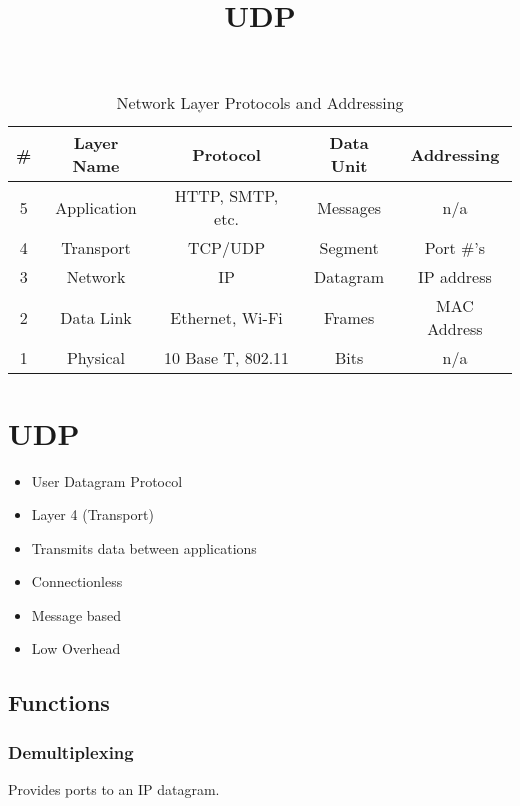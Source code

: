 \documentclass{article}
\title{UDP}
\begin{document}
\maketitle

\begin{table}[h!]
    \centering
    \begin{tabular}{|c|c|c|c|c|}
        \hline
        \# & \textbf{Layer Name} & \textbf{Protocol} & \textbf{Data Unit} & \textbf{Addressing} \\
        \hline
        5  & Application         & HTTP, SMTP, etc.  & Messages           & n/a                 \\
        4  & Transport           & TCP/UDP           & Segment            & Port \#'s           \\
        3  & Network             & IP                & Datagram           & IP address          \\
        2  & Data Link           & Ethernet, Wi-Fi   & Frames             & MAC Address         \\
        1  & Physical            & 10 Base T, 802.11 & Bits               & n/a                 \\
        \hline
    \end{tabular}
    \caption{Network Layer Protocols and Addressing}
\end{table}

\section*{UDP}
\begin{itemize}
    \item User Datagram Protocol
    \item Layer 4 (Transport)
    \item Transmits data between applications
    \item Connectionless
    \item Message based
    \item Low Overhead
\end{itemize}

\subsection*{Functions}
\subsubsection*{Demultiplexing}
Provides ports to an IP datagram.
\end{document}

